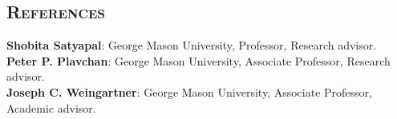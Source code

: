 \documentclass[marg, centered]{res}
\begin{document}
\begin{resume}
\section{{\scshape \bfseries References}}
\textbf{Shobita Satyapal}{: George Mason University, Professor, Research advisor.}\\
\textbf{Peter P. Plavchan}{: George Mason University, Associate Professor, Research advisor.}\\
\textbf{Joseph C. Weingartner}{: George Mason University,  Associate Professor, Academic advisor.}\\

\end{resume}
\end{document}
